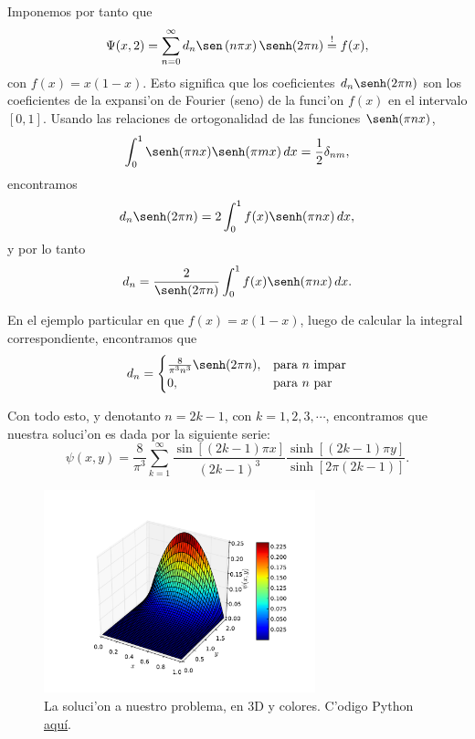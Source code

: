 Imponemos por tanto que
\begin{equation}
\Psi(x,2) = \sum_{n=0}^\infty d_n \sen\left(n\pi x\right)\senh(2\pi n) \stackrel{!}{=} f(x),
\end{equation}
con $f(x)=x(1-x)$. Esto significa que los coeficientes $d_n\senh(2\pi n)$ son los coeficientes de la expansi'on de Fourier (seno) de la funci'on $f(x)$ en el intervalo $[0,1]$. Usando las relaciones de ortogonalidad de las funciones $\senh(\pi nx)$, 
\begin{equation}
\int_0^1 \senh(\pi nx)\senh(\pi mx)\,dx = \frac{1}{2}\delta_{nm},
\end{equation}
encontramos
\begin{equation}
d_n\senh(2\pi n) = 2 \int_0^1 f(x)\senh(\pi nx)\,dx,
\end{equation}
y por lo tanto
\begin{equation}
d_n = \frac{2}{\senh(2\pi n)} \int_0^1 f(x)\senh(\pi nx)\,dx.
\end{equation}

En el ejemplo particular en que $f(x)=x(1-x)$, luego de calcular la integral correspondiente, encontramos que
\begin{equation}
d_n = \begin{cases}
	\frac{8}{\pi^3n^3}\senh(2\pi n) , & \text{para } n \text{ impar} \\
	0 , & \text{para } n \text{ par} \end{cases}
\end{equation}

Con todo esto, y denotanto $n=2k-1$, con $k=1,2,3,\cdots$, encontramos que nuestra soluci'on es dada por la siguiente serie:
\begin{equation}
\psi(x,y)=\frac{8}{\pi^3}\sum_{k=1}^{\infty}\frac{\sin[(2k-1) \pi x]}{(2k-1)^3}\frac{\sinh[(2k-1)\pi y]}{\sinh[2\pi (2k-1)]}.
\end{equation}

\begin{figure}[H]
\centering
\includegraphics[angle=0,width=0.7\textwidth]{figs/fig-MSV-rectangulo-3D.pdf}
\caption{La soluci'on a nuestro problema, en 3D y colores. C'odigo Python \href{https://github.com/gfrubi/FM2/blob/master/figuras-editables/fig-MSV-Laplace-rectangulo.py}{aqu\'i}.}
\label{fig-SolLap}
\end{figure}

